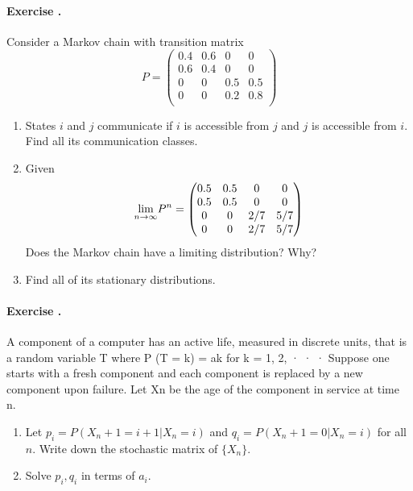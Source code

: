 \documentclass[12pt,a4paper]{article}
\newcounter{num}  %
\begin{document}
\paragraph{Exercise \thenum.}%
	Consider a Markov chain with transition matrix
	$$P = \left(
	\begin{matrix}
		0.4 &0.6& 0& 0\\
		0.6& 0.4& 0 &0\\
		0& 0 &0.5 &0.5\\
		0 &0 &0.2 &0.8\\
	\end{matrix}
	\right)
	$$
	\begin{enumerate}
		\item States $i$ and $j$ communicate if $i$ is accessible from $j$ and $j$ is accessible from $i$. 
		Find all its communication classes.
		\item Given
		$$
		\underset{n\rightarrow \infty}{\rm lim} P^n = 
		 \left(
		\begin{matrix}
			0.5 &0.5& 0& 0\\
			0.5& 0.5& 0 &0\\
			0& 0 &2/7 &5/7\\
			0 &0 &2/7 &5/7\\
		\end{matrix}
		\right)
		$$
		Does the Markov chain have a limiting distribution? Why?
		\item Find all of its stationary distributions.
	\end{enumerate} 
	
	\paragraph{Exercise \thenum.} %
		A component of a computer has an active life, measured in discrete units, that is a random variable T where
		P (T = k) = ak for k = 1, 2, · · · Suppose one starts with a fresh component and each component is replaced
		by a new component upon failure. Let Xn be the age of the component in service at time n.
		\begin{enumerate}
			\item Let $p_i = P (X_n+1 = i + 1 | X_n = i)$ and $q_i = P (X_n+1 = 0 | X_n = i)$ for all $n$. 
			Write down the stochastic matrix of $\{X_n\}$.
			\item Solve $p_i, q_i$ in terms of $a_i$.
		\end{enumerate}
	
\end{document}
